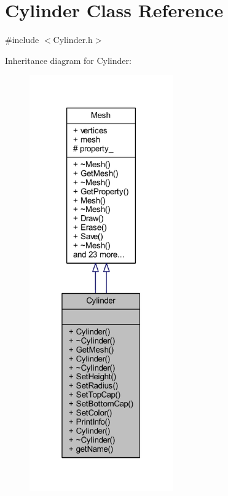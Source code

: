 \hypertarget{class_cylinder}{}\section{Cylinder Class Reference}
\label{class_cylinder}


{\ttfamily \#include $<$Cylinder.\+h$>$}



Inheritance diagram for Cylinder\+:
\nopagebreak
\begin{figure}[H]
\begin{center}
\leavevmode
\includegraphics[width=175pt]{class_cylinder__inherit__graph}
\end{center}
\end{figure}


